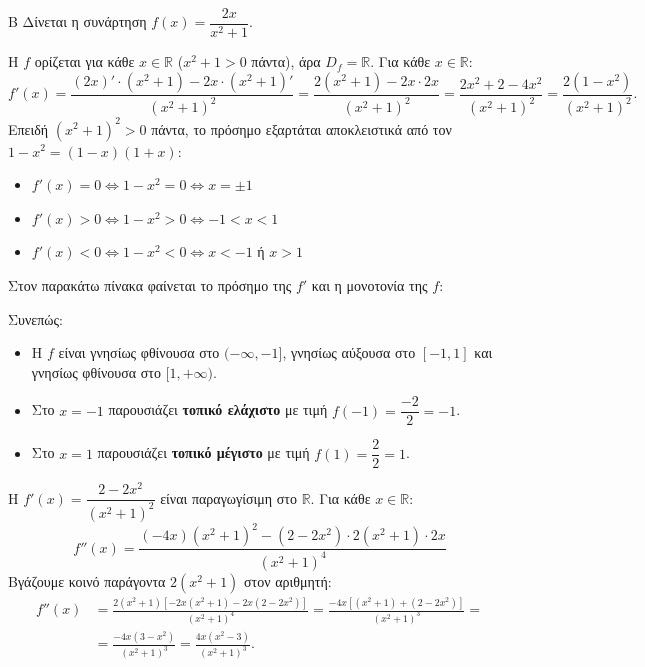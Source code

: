\begin{thema}{Β}
Δίνεται η συνάρτηση $f(x)=\dfrac{2x}{x^2+1}$.

\begin{erwthma}

\item Η $f$ ορίζεται για κάθε $x\in\mathbb{R}$ ($x^2+1>0$ πάντα), άρα $D_f=\mathbb{R}$. Για κάθε $x\in\mathbb{R}$:
\[
f'(x)=\frac{(2x)'\cdot(x^2+1)-2x\cdot(x^2+1)'}{(x^2+1)^2}
=\frac{2(x^2+1)-2x\cdot2x}{(x^2+1)^2}
=\frac{2x^2+2-4x^2}{(x^2+1)^2}
=\frac{2(1-x^2)}{(x^2+1)^2}.
\]
Επειδή $(x^2+1)^2>0$ πάντα, το πρόσημο εξαρτάται αποκλειστικά από τον $1-x^2=(1-x)(1+x)$:
\begin{itemize}
    \item $f'(x)=0\Leftrightarrow 1-x^2=0\Leftrightarrow x=\pm1$
    \item $f'(x)>0\Leftrightarrow 1-x^2>0\Leftrightarrow -1<x<1$
    \item $f'(x)<0\Leftrightarrow 1-x^2<0\Leftrightarrow x<-1$ ή $x>1$
\end{itemize}
Στον παρακάτω πίνακα φαίνεται το πρόσημο της $f'$ και η μονοτονία της $f$:
\begin{center}
\end{center}
Συνεπώς:
\begin{itemize}
    \item Η $f$ είναι γνησίως φθίνουσα στο $(-\infty,-1]$, γνησίως αύξουσα στο $[-1,1]$ και γνησίως φθίνουσα στο $[1,+\infty)$.
    \item Στο $x=-1$ παρουσιάζει \textbf{τοπικό ελάχιστο} με τιμή $f(-1)=\dfrac{-2}{2}=-1$.
    \item Στο $x=1$ παρουσιάζει \textbf{τοπικό μέγιστο} με τιμή $f(1)=\dfrac{2}{2}=1$.
\end{itemize}

\item Η $f'(x)=\dfrac{2-2x^2}{(x^2+1)^2}$ είναι παραγωγίσιμη στο $\mathbb{R}$.
Για κάθε $x\in\mathbb{R}$:
\[
f''(x)=\frac{(-4x)(x^2+1)^2-(2-2x^2)\cdot2(x^2+1)\cdot2x}{(x^2+1)^4}
\]
Βγάζουμε κοινό παράγοντα $2(x^2+1)$ στον αριθμητή:
\begin{align*}
f''(x)&=\frac{2(x^2+1)\left[-2x(x^2+1)-2x(2-2x^2)\right]}{(x^2+1)^4}
=\frac{-4x\left[(x^2+1)+(2-2x^2)\right]}{(x^2+1)^3}=\\&=\frac{-4x(3-x^2)}{(x^2+1)^3}
=\frac{4x(x^2-3)}{(x^2+1)^3}.
\end{align*}



\end{erwthma}
\end{thema}

